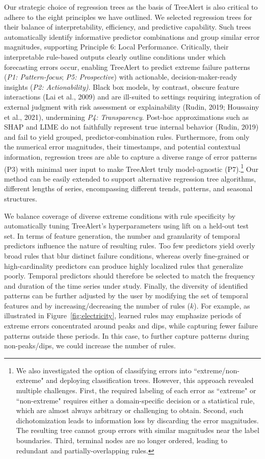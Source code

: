 \documentclass[12pt]{article}
\begin{document}
Our strategic choice of regression trees as the basis of TreeAlert is also critical to adhere to the eight principles we have outlined. We selected regression trees for their balance of interpretability, efficiency, and predictive capability. Such trees automatically identify informative predictor combinations and group similar error magnitudes, supporting Principle 6: Local Performance. Critically, their interpretable rule-based outputs clearly outline conditions under which forecasting errors occur, enabling TreeAlert to predict extreme failure patterns (\emph{P1: Pattern-focus}; \emph{P5: Prospective}) with actionable, decision-maker-ready insights (\emph{P2: Actionability)}. Black box models, by contrast, obscure feature interactions (Lai et al., 2009) and are ill-suited to settings requiring integration of external judgment with risk assessment or explainability (Rudin, 2019; Houssainy et al., 2021), undermining \emph{P4: Transparency}. Post-hoc approximations such as SHAP and LIME do not faithfully represent true internal behavior (Rudin, 2019) and fail to yield grouped, predictor-combination rules. Furthermore, from only the numerical error magnitudes, their timestamps, and potential contextual information, regression trees are able to capture a diverse range of error patterns (P3) with minimal user input to make TreeAlert truly model-agnostic (P7).\footnote{We also investigated the option of classifying errors into ``extreme/non-extreme" and deploying classification trees. However,
this approach revealed multiple challenges. First, the required labeling of each error as ``extreme" or ``non-extreme" requires either a domain-specific decision or a statistical rule, which are almost always arbitrary or challenging to obtain. Second, such dichotomization leads to information loss by discarding the error magnitudes. The resulting tree cannot group errors with similar magnitudes near the label boundaries. Third, terminal nodes are no longer ordered, leading to redundant and partially-overlapping rules.}
Our method can be easily extended to support alternative regression tree algorithms, different lengths of series, encompassing different trends, patterns, and seasonal structures.

We balance coverage of diverse extreme conditions with rule specificity by automatically tuning TreeAlert's hyperparameters using lift on a held-out test set. In terms of feature generation, the number and granularity of temporal predictors influence the nature of resulting rules. Too few predictors yield overly broad rules that blur distinct failure conditions, whereas overly fine-grained or high-cardinality predictors can produce highly localized rules that generalize poorly. Temporal predictors should therefore be selected to match the frequency and duration of the time series under study. Finally, the diversity of identified patterns can be further adjusted by the user by modifying the set of temporal features and by increasing/decreasing the number of rules ($k$). For example, as illustrated in Figure~\ref{fig:electricity}, learned rules may emphasize periods of extreme errors concentrated around peaks and dips, while capturing fewer failure patterns outside these periods. In this case, to further capture patterns during non-peaks/dips, we could increase the number of rules.
\end{document}
